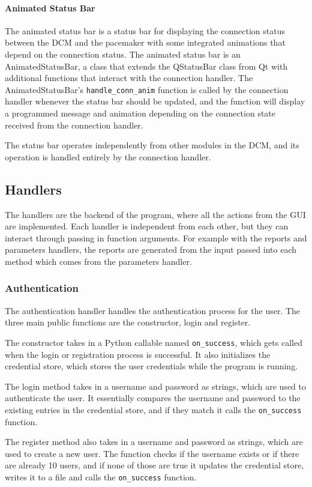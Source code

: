 \documentclass[12pt]{article}
\begin{document}
\paragraph{Animated Status Bar}
The animated status bar is a status bar for displaying the connection status between the DCM and the pacemaker with some integrated animations that depend on the connection status. The animated status bar is an AnimatedStatusBar, a class that extends the QStatusBar class from Qt with additional functions that interact with the connection handler. The AnimatedStatusBar's \verb|handle_conn_anim| function is called by the connection handler whenever the status bar should be updated, and the function will display a programmed message and animation depending on the connection state received from the connection handler.

The status bar operates independently from other modules in the DCM, and its operation is handled entirely by the connection handler.

\subsection{Handlers}
The handlers are the backend of the program, where all the actions from the GUI are implemented. Each handler is independent from each other, but they can interact through passing in function arguments. For example with the reports and parameters handlers, the reports are generated from the input passed into each method which comes from the parameters handler.

\subsubsection{Authentication}
The authentication handler handles the authentication process for the user. The three main public functions are the constructor, login and register.

The constructor takes in a Python callable named \verb|on_success|, which gets called when the login or registration process is successful.
It also initializes the credential store, which stores the user credentials while the program is running.

The login method takes in a username and password as strings, which are used to authenticate the user. It essentially compares the username and password to the existing entries in the credential store, and if they match it calls the \verb|on_success| function.

The register method also takes in a username and password as strings, which are used to create a new user. The function checks if the username exists or if there are already 10 users, and if none of those are true it updates the credential store, writes it to a file and calls the \verb|on_success| function.
\end{document}

